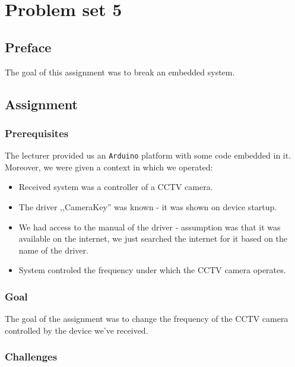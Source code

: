 \section{Problem set 5}
\subsection{Preface}

The goal of this assignment was to break an embedded system.

\subsection{Assignment}

\subsubsection{Prerequisites}

The lecturer provided us an \texttt{Arduino} platform with some code embedded in it. Moreover, we were given a context in which we operated:

\begin{itemize}
  \item Received system was a controller of a CCTV camera.
  \item The driver ,,CameraKey'' was known - it was shown on device startup.
  \item {
    We had access to the manual of the driver - assumption was that it was      available on the internet, we just searched the internet for it based
    on the name of the driver.
  }
  \item System controled the frequency under which the CCTV camera operates.
\end{itemize}


\subsubsection{Goal}

The goal of the assignment was to change the frequency of the CCTV camera controlled by the device we've received.

\subsubsection{Challenges}
\label{seq:challenges}

